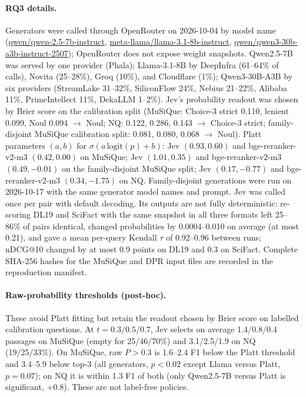 \paragraph{RQ3 details.}\label{app:extra} Generators were called through OpenRouter on 2026-10-04 by model name (\url{qwen/qwen-2.5-7b-instruct}, \url{meta-llama/llama-3.1-8b-instruct}, \url{qwen/qwen3-30b-a3b-instruct-2507}); OpenRouter does not expose weight snapshots. Qwen2.5-7B was served by one provider (Phala); Llama-3.1-8B by DeepInfra (61--64\% of calls), Novita (25--28\%), Groq (10\%), and Cloudflare (1\%); Qwen3-30B-A3B by six providers (StreamLake 31--32\%, SiliconFlow 24\%, Nebius 21--22\%, Alibaba 11\%, PrimeIntellect 11\%, DekaLLM 1--2\%).
Jev's probability readout was chosen by Brier score on the calibration split (MuSiQue: Choice-3 strict 0.110, lenient 0.099, Noul 0.094 $\rightarrow$ Noul; NQ: 0.122, 0.286, 0.143 $\rightarrow$ Choice-3 strict; family-disjoint MuSiQue calibration split: 0.081, 0.080, 0.068 $\rightarrow$ Noul). Platt parameters $(a,b)$ for $\sigma(a\,\mathrm{logit}(p)+b)$: Jev $(0.93, 0.60)$ and bge-reranker-v2-m3 $(0.42, 0.00)$ on MuSiQue; Jev $(1.01, 0.35)$ and bge-reranker-v2-m3 $(0.49, -0.01)$ on the family-disjoint MuSiQue split; Jev $(0.17, -0.77)$ and bge-reranker-v2-m3 $(0.34, -1.75)$ on NQ. Family-disjoint generations were run on 2026-10-17 with the same generator model names and prompt. Jev was called once per pair with default decoding. Its outputs are not fully deterministic: re-scoring DL19 and SciFact with the same snapshot in all three formats left 25--86\% of pairs identical, changed probabilities by 0.0004--0.010 on average (at most 0.21), and gave a mean per-query Kendall $\tau$ of 0.92--0.96 between runs; nDCG@10 changed by at most 0.9 points on DL19 and 0.3 on SciFact. Complete SHA-256 hashes for the MuSiQue and DPR input files are recorded in the reproduction manifest.

\paragraph{Raw-probability thresholds (post-hoc).} These avoid Platt fitting but retain the readout chosen by Brier score on labelled calibration questions. At $t=0.3/0.5/0.7$, Jev selects on average 1.4/0.8/0.4 passages on MuSiQue (empty for 25/46/70\%) and 3.1/2.5/1.9 on NQ (19/25/33\%). On MuSiQue, raw $P>0.3$ is 1.6--2.4 F1 below the Platt threshold and 3.4--5.9 below top-3 (all generators, $p<0.02$ except Llama versus Platt, $p=0.07$); on NQ it is within 1.3 F1 of both (only Qwen2.5-7B versus Platt is significant, $+0.8$). These are not label-free policies.

